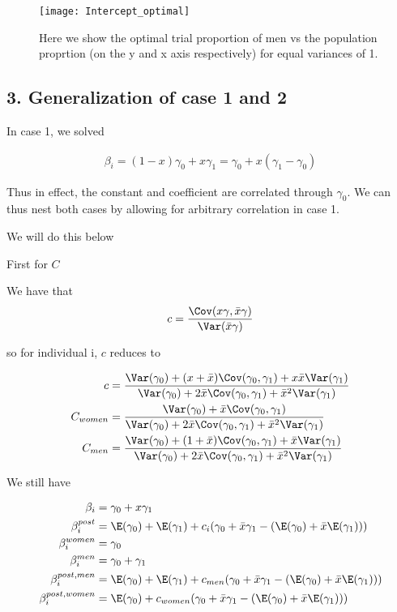 \begin{figure}[ht!]
\label{fig:v2-intercept-optim}
  \centering
	\texttt{[image: Intercept\_optimal]}
	\caption{Here we show the optimal trial proportion of men vs the population proprtion (on the y and x axis respectively) for equal variances of 1.} 
\end{figure}

\subsection*{3. Generalization of case 1 and 2}

In case 1, we solved 

\begin{align*}
	\beta_i = (1 - x) \gamma_0 + x \gamma_1 = \gamma_0 + x(\gamma_1 - \gamma_0)
\end{align*} 

Thus in effect, the constant and coefficient are correlated through $\gamma_0$. We can thus nest both cases by allowing for arbitrary correlation in case 1.


We will do this below

First for $C$ 

We have that
\begin{align*}
	c = \frac{\Cov (x \gamma, \bar{x} \gamma)}{ \Var( \bar{x} \gamma )}
\end{align*} 

so for individual i, $c$ reduces to

\begin{align*}
		c &= \frac{\Var(\gamma_0) + (x + \bar{x}) \Cov(\gamma_0, \gamma_1) + x \bar{x} \Var(\gamma_1)}{\Var(\gamma_0) + 2 \bar{x} \Cov(\gamma_0, \gamma_1) + \bar{x}^2\Var(\gamma_1)} \\
		C_{women} &= \frac{\Var(\gamma_0) + \bar{x} \Cov(\gamma_0, \gamma_1)}{\Var(\gamma_0) + 2 \bar{x} \Cov(\gamma_0, \gamma_1) + \bar{x}^2\Var(\gamma_1)} \\
	C_{men} &= \frac{\Var(\gamma_0) + (1 + \bar{x}) \Cov(\gamma_0, \gamma_1) + \bar{x} \Var(\gamma_1)}{\Var(\gamma_0) + 2 \bar{x} \Cov(\gamma_0, \gamma_1) + \bar{x}^2\Var(\gamma_1)} \\
\end{align*} 

We still have

\begin{align*}
	\beta_i &= \gamma_0 + x \gamma_1 \\
	\beta_{i}^{post} &= \E(\gamma_0) + \E(\gamma_1)  + c_i ( \gamma_0 + \bar{x} \gamma_1 - (\E(\gamma_0) + \bar{x} \E(\gamma_1))) \\
	\beta_i^{women} &= \gamma_0 \\
	\beta_i^{men} &= \gamma_0 + \gamma_1 \\
	\beta_i^{post,men} &= \E(\gamma_0) + \E(\gamma_1)  + c_{men} ( \gamma_0 + \bar{x} \gamma_1 - (\E(\gamma_0) + \bar{x} \E(\gamma_1))) \\
	\beta_i^{post, women} &= \E(\gamma_0) +  c_{women} ( \gamma_0 + \bar{x} \gamma_1 - (\E(\gamma_0) + \bar{x} \E(\gamma_1))) \\
\end{align*} 

